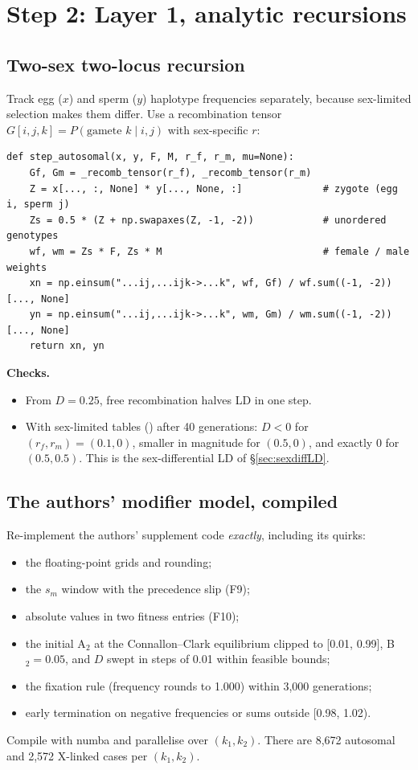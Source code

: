\section{Step 2: Layer 1, analytic recursions}
\subsection{Two-sex two-locus recursion}
Track egg ($x$) and sperm ($y$) haplotype frequencies separately, because sex-limited selection makes them differ. Use a recombination tensor $G[i,j,k]=P(\text{gamete }k\mid i,j)$ with sex-specific $r$:
\begin{lstlisting}
def step_autosomal(x, y, F, M, r_f, r_m, mu=None):
    Gf, Gm = _recomb_tensor(r_f), _recomb_tensor(r_m)
    Z = x[..., :, None] * y[..., None, :]              # zygote (egg i, sperm j)
    Zs = 0.5 * (Z + np.swapaxes(Z, -1, -2))            # unordered genotypes
    wf, wm = Zs * F, Zs * M                            # female / male weights
    xn = np.einsum("...ij,...ijk->...k", wf, Gf) / wf.sum((-1, -2))[..., None]
    yn = np.einsum("...ij,...ijk->...k", wm, Gm) / wm.sum((-1, -2))[..., None]
    return xn, yn
\end{lstlisting}
\textbf{Checks.}
\begin{itemize}
\item From $D=0.25$, free recombination halves LD in one step.
\item With sex-limited tables () after 40 generations: $D<0$ for $(r_f,r_m)=(0.1,0)$, smaller in magnitude for $(0.5,0)$, and exactly 0 for $(0.5,0.5)$. This is the sex-differential LD of \S\ref{sec:sexdiffLD}.
\end{itemize}

\subsection{The authors' modifier model, compiled}
Re-implement the authors' supplement code \emph{exactly}, including its quirks:
\begin{itemize}
\item the floating-point  grids and rounding;
\item the $s_m$ window with the precedence slip (F9);
\item absolute values in two fitness entries (F10);
\item the initial A$_2$ at the Connallon--Clark equilibrium clipped to [0.01, 0.99], B$_2=0.05$, and $D$ swept in steps of 0.01 within feasible bounds;
\item the fixation rule (frequency rounds to 1.000) within 3,000 generations;
\item early termination on negative frequencies or sums outside [0.98, 1.02).
\end{itemize}
Compile with numba and parallelise over $(k_1,k_2)$. There are 8,672 autosomal and 2,572 X-linked cases per $(k_1,k_2)$.

